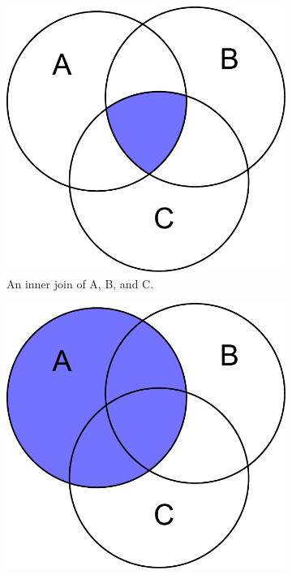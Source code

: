 \begin{figure}[H] %
\captionsetup[subfigure]{justification=centering}
\centering
\begin{subfigure}{.4\textwidth}
    \centering
    \includegraphics[width=\textwidth]{figures/inner_join.pdf}
    \caption{An inner join of A, B, and C.}
    \label{fig:sql2-inner-join}
\end{subfigure}
\hfil
\begin{subfigure}{.4\textwidth}
    \centering
    \includegraphics[width=\textwidth]{figures/left_outer.pdf}

\end{subfigure}
\end{figure}
